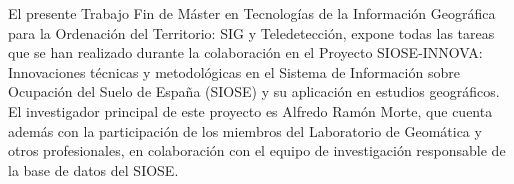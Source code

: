 
\begin{prologo}
El presente Trabajo Fin de Máster en Tecnologías de la Información Geográfica para la Ordenación del Territorio: SIG y Teledetección, expone todas las tareas que se han realizado durante la colaboración en el Proyecto SIOSE-INNOVA: Innovaciones técnicas y metodológicas en el Sistema de Información sobre Ocupación del Suelo de España (SIOSE) y su aplicación en estudios geográficos. El investigador principal de este proyecto es Alfredo Ramón Morte, que cuenta además con la participación de los miembros del Laboratorio de Geomática y otros profesionales, en colaboración con el equipo de investigación responsable de la base de datos del SIOSE.
\end{prologo}
